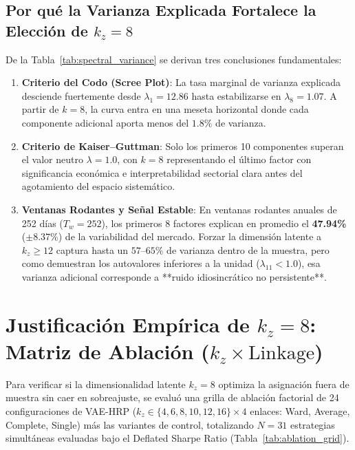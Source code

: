 \documentclass[11pt,a4paper]{article}
\begin{document}
\subsection{Por qué la Varianza Explicada Fortalece la Elección de $k_z = 8$}

De la Tabla~\ref{tab:spectral_variance} se derivan tres conclusiones fundamentales:
\begin{enumerate}
    \item \textbf{Criterio del Codo (Scree Plot)}: La tasa marginal de varianza explicada desciende fuertemente desde $\lambda_1 = 12.86$ hasta estabilizarse en $\lambda_8 = 1.07$. A partir de $k=8$, la curva entra en una meseta horizontal donde cada componente adicional aporta menos del $1.8\%$ de varianza.
    \item \textbf{Criterio de Kaiser--Guttman}: Solo los primeros 10 componentes superan el valor neutro $\lambda = 1.0$, con $k=8$ representando el último factor con significancia económica e interpretabilidad sectorial clara antes del agotamiento del espacio sistemático.
    \item \textbf{Ventanas Rodantes y Señal Estable}: En ventanas rodantes anuales de 252 días ($T_w = 252$), los primeros 8 factores explican en promedio el \textbf{47.94\%} ($\pm 8.37\%$) de la variabilidad del mercado. Forzar la dimensión latente a $k_z \ge 12$ captura hasta un $57$--$65\%$ de varianza dentro de la muestra, pero como demuestran los autovalores inferiores a la unidad ($\lambda_{11} < 1.0$), esa varianza adicional corresponde a **ruido idiosincrático no persistente**.
\end{enumerate}

\section{Justificación Empírica de $k_z = 8$: Matriz de Ablación ($k_z \times \text{Linkage}$)}

Para verificar si la dimensionalidad latente $k_z = 8$ optimiza la asignación fuera de muestra sin caer en sobreajuste, se evaluó una grilla de ablación factorial de 24 configuraciones de VAE-HRP ($k_z \in \{4, 6, 8, 10, 12, 16\} \times 4$ enlaces: Ward, Average, Complete, Single) más las variantes de control, totalizando $N = 31$ estrategias simultáneas evaluadas bajo el Deflated Sharpe Ratio (Tabla~\ref{tab:ablation_grid}).
\end{document}
